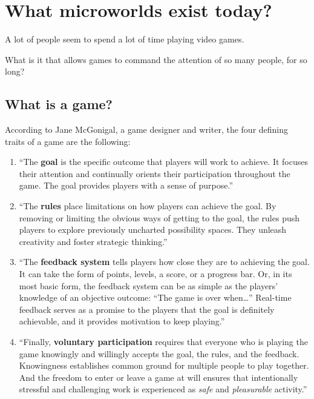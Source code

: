 \section{What microworlds exist today?}

A lot of people seem to spend a lot of time playing video games\cite{ted:mcgonigal}.

What is it that allows games to command the attention of so many people, for so long?

\subsection{What is a game?}

According to Jane McGonigal, a game designer and writer, the four
defining traits of a game are the following:

\begin{enumerate}

\item
  ``The \textbf{goal} is the specific outcome that players will work to
  achieve. It focuses their attention and continually orients their
  participation throughout the game. The goal provides players with a
  sense of purpose.''\cite{rebroken}

\item
  ``The \textbf{rules} place limitations on how players can achieve the
  goal. By removing or limiting the obvious ways of getting to the goal,
  the rules push players to explore previously uncharted possibility
  spaces. They unleash creativity and foster strategic thinking.''\cite{rebroken}

\item
  ``The \textbf{feedback system} tells players how close they are to
  achieving the goal. It can take the form of points, levels, a score,
  or a progress bar. Or, in its most basic form, the feedback system can
  be as simple as the players' knowledge of an objective outcome: ``The
  game is over when\ldots'' Real-time feedback serves as a promise to
  the players that the goal is definitely achievable, and it provides
  motivation to keep playing.''\cite{rebroken}

\item
  ``Finally, \textbf{voluntary participation} requires that everyone who
  is playing the game knowingly and willingly accepts the goal, the
  rules, and the feedback. Knowingness establishes common ground for
  multiple people to play together. And the freedom to enter or leave a
  game at will ensures that intentionally stressful and challenging work
  is experienced as \emph{safe} and \emph{pleasurable} activity.''\cite{rebroken}
  
\end{enumerate}

